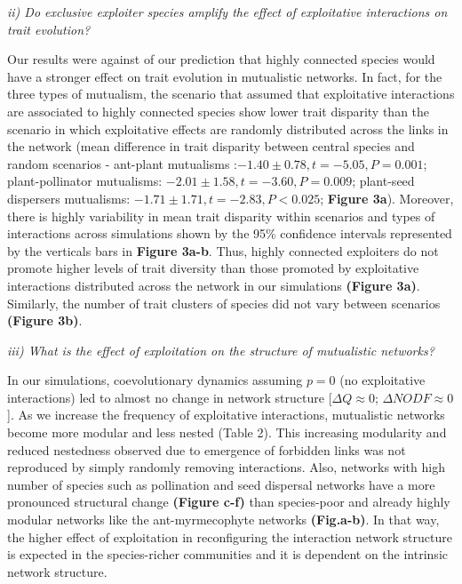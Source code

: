 \documentclass[a4paper, 12pt]{article}
\begin{document}
\textit{ii) Do exclusive exploiter species amplify the effect of exploitative interactions on trait evolution?}

Our results were against of our prediction that highly connected species would have a stronger effect on trait evolution in mutualistic networks.  In fact, for the three types of mutualism, the scenario that assumed that exploitative interactions are associated to highly connected species show lower trait disparity than the scenario in which exploitative effects are randomly distributed across the links in the network (mean difference in trait disparity between central species and random scenarios - ant-plant mutualisms :$ -1.40 \pm 0.78, t = -5.05, P = 0.001$; plant-pollinator mutualisms: $-2.01 \pm 1.58, t = -3.60, P = 0.009$; plant-seed dispersers mutualisms: $-1.71 \pm 1.71, t = -2.83, P < 0.025$; \textbf{Figure 3a}).  Moreover, there is highly variability in mean trait disparity within scenarios and types of interactions across simulations shown by the 95\% confidence intervals represented by the verticals bars in \textbf{Figure 3a-b}. Thus, highly connected exploiters do not promote higher levels of trait diversity than those promoted by exploitative interactions distributed across the network in our simulations \textbf{(Figure 3a)}. Similarly, the number of trait clusters of species did not vary between scenarios \textbf{(Figure 3b)}. 

\textit{iii) What is the effect of exploitation on the structure of mutualistic networks?}

In our simulations, coevolutionary dynamics assuming $p = 0$ (no exploitative interactions) led to almost no change in network structure [$\Delta Q \approx 0$; $\Delta NODF \approx 0$]. As we increase the frequency of exploitative interactions, mutualistic networks become more modular and less nested (Table 2). This increasing modularity and reduced nestedness observed due to emergence of forbidden links was not reproduced by simply randomly removing interactions. Also, networks with high number of species such as  pollination and seed dispersal networks have a more pronounced structural change \textbf{(Figure c-f)} than species-poor and already highly modular networks like the ant-myrmecophyte networks \textbf{(Fig.a-b)}. In that way, the higher effect of exploitation in reconfiguring the interaction network structure is expected in the species-richer communities and it is dependent on the intrinsic network structure.

\end{document}
